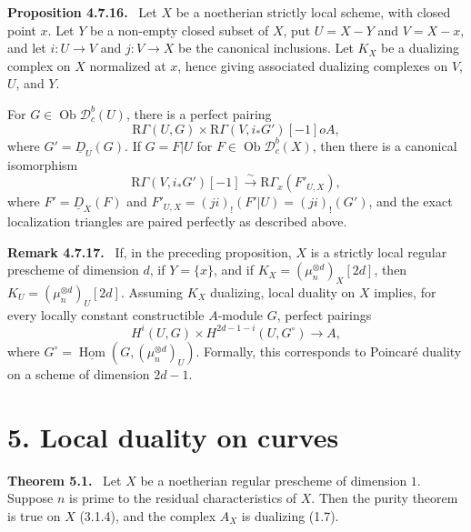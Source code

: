\documentclass[11pt]{article}
\theoremstyle{plain}
\theoremstyle{definition}
\theoremstyle{remark}
\newenvironment{statement}[1]{\par\medskip\noindent\textbf{#1.}\ }{\par\medskip}
\newcommand{\D}{\mathcal D}\newcommand{\E}{\mathcal E}\newcommand{\F}{\mathcal F}
\DeclareMathOperator{\Hom}{Hom}
\DeclareMathOperator{\ob}{Ob}
\newcommand{\R}{\mathrm R}
\begin{document}
\begin{statement}{Proposition 4.7.16}
Let $X$ be a noetherian strictly local scheme, with closed point $x$. Let $Y$ be a non-empty closed subset of $X$, put $U=X-Y$ and $V=X-x$, and let $i:U\to V$ and $j:V\to X$ be the canonical inclusions. Let $K_X$ be a dualizing complex on $X$ normalized at $x$, hence giving associated dualizing complexes on $V$, $U$, and $Y$.

For $G\in\ob\D_c^b(U)$, there is a perfect pairing
\[
   \R\Gamma(U,G)\times\R\Gamma(V,i_*G')[-1]	o A,
\]
where $G'=\underline D_U(G)$. If $G=F|U$ for $F\in\ob\D_c^b(X)$, then there is a canonical isomorphism
\[
   \R\Gamma(V,i_*G')[-1]\xrightarrow{\sim}\R\Gamma_x(F'_{U,X}),
\]
where $F'=\underline D_X(F)$ and $F'_{U,X}=(ji)_!(F'|U)=(ji)_!(G')$, and the exact localization triangles are paired perfectly as described above.
\end{statement}

\begin{statement}{Remark 4.7.17}
If, in the preceding proposition, $X$ is a strictly local regular prescheme of dimension $d$, if $Y=\{x\}$, and if $K_X=(\mu_n^{\otimes d})_X[2d]$, then $K_U=(\mu_n^{\otimes d})_U[2d]$. Assuming $K_X$ dualizing, local duality on $X$ implies, for every locally constant constructible $A$-module $G$, perfect pairings
\[
   H^i(U,G)\times H^{2d-1-i}(U,G^\circ)\longrightarrow A,
\]
where $G^\circ=\underline{\Hom}(G,(\mu_n^{\otimes d})_U)$. Formally, this corresponds to Poincaré duality on a scheme of dimension $2d-1$.
\end{statement}

\section*{5. Local duality on curves}

\begin{statement}{Theorem 5.1}
Let $X$ be a noetherian regular prescheme of dimension $1$. Suppose $n$ is prime to the residual characteristics of $X$. Then the purity theorem is true on $X$ (3.1.4), and the complex $A_X$ is dualizing (1.7).
\end{statement}
\end{document}
